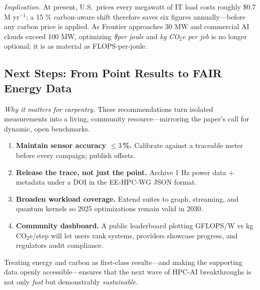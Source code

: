 \noindent
\emph{Implication.} At present, U.S.\ prices every megawatt of IT load costs roughly \$0.7 M yr\(^{-1}\); a 15 \% carbon-aware shift therefore saves six figures annually—before any carbon price is applied. As Frontier approaches 30 MW and commercial AI clouds exceed 100 MW,
optimizing \emph{\$per joule} and \emph{kg CO\(_2\)e per job} is no longer optional; it is as material as FLOPS-per-joule.

\subsection{Next Steps: From Point Results to FAIR Energy Data}
\label{sec:energy:agenda}

\textit{Why it matters for carpentry.}  
These recommendations turn isolated measurements into a living,
community resource—mirroring the paper’s call for dynamic, open
benchmarks.

\begin{enumerate}[leftmargin=*]
  \item \textbf{Maintain sensor accuracy \(\le3\)\,\%.} Calibrate against
        a traceable meter before every campaign; publish offsets.
  \item \textbf{Release the trace, not just the point.} Archive 1 Hz
        power data + metadata under a DOI in the EE-HPC-WG JSON format.
  \item \textbf{Broaden workload coverage.} Extend suites to graph,
        streaming, and quantum kernels so 2025 optimizations remain
        valid in 2030.
  \item \textbf{Community dashboard.} A public leaderboard plotting
        GFLOPS/W vs kg CO\(_2\)e/step will let users rank systems,
        providers showcase progress, and regulators audit compliance.
\end{enumerate}

Treating energy and carbon as first-class results—and making the
supporting data openly accessible—ensures that the next wave of HPC-AI
breakthroughs is not only \emph{fast} but demonstrably \emph{sustainable}.